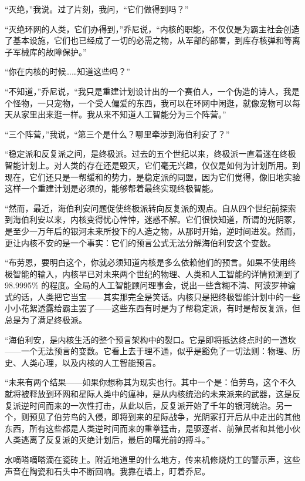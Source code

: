 \documentclass[AutoFakeBold=true]{book}
\begin{document}
``灭绝，''我说。过了片刻，我问，``它们做得到吗？''

``灭绝环网的人类，它们办得到，''乔尼说，``内核的职能，不仅仅是为霸主社会创造了基本设施，它们也已经成了一切的必需之物，从军部的部署，到库存核弹和等离子军械库的故障保护。''

``你在内核的时候……知道这些吗？''

``不知道，''乔尼说，``我只是重建计划设计出的一个赛伯人，一个伪造的诗人，我是个怪物，一只宠物，一个受人偏爱的东西，我可以在环网中闲逛，就像宠物可以每天从家里出来逛一样。我从来不知道人工智能分为三个阵营。''

``三个阵营，''我说，``第三个是什么？哪里牵涉到海伯利安了？''

``稳定派和反复派之间，是终极派。过去的五个世纪以来，终极派一直着迷在终极智能计划上。对人类的存在还是毁灭，它们毫无兴趣，仅仅是如何为计划所用。到现在，它们还只是一帮缓和的势力，是稳定派的同盟，因为它们觉得，像旧地实验这样一个重建计划是必须的，能够帮着最终实现终极智能。

``然而，最近，海伯利安问题促使终极派转向反复派的观点。自从四个世纪前探索到海伯利安以来，内核变得忧心忡忡，迷惑不解。它们很快知道，所谓的光阴冢，是至少一万年后的银河未来所投下的人造之物，从那时开始，逆时间进发。然而，更让内核不安的是一个事实：它们的预言公式无法分解海伯利安这个变数。

``布劳恩，要明白这个，你就必须知道内核是多么依赖他们的预言。如果不使用终极智能的输入，内核早已对未来两个世纪的物理、人类和人工智能的详情预测到了 98.9995\% 的程度。全局的人工智能顾问理事会，说出一些含糊不清、阿波罗神谕式的话，人类把它当宝——其实那完全是笑话。内核只是把终极智能计划中的一些小小花絮透露给霸主罢了——这些东西有时是为了帮稳定派，有时是帮反复派，但总是为了满足终极派。

``海伯利安，是内核生活的整个预言架构中的裂口。它是即将抵达终点时的一道坎——一个无法预言的变数。它看上去于理不通，似乎是豁免了一切法则：物理、历史、人类心理，以及内核的人工智能预言。

``未来有两个结果——如果你想称其为现实也行。其中一个是：伯劳鸟，这个不久就将被释放到环网和星际人类中的瘟神，是从内核统治的未来派来的武器，这是反复派逆时间而来的一次性打击，从此以后，反复派开始了千年的银河统治。另一个，则预见了伯劳鸟的入侵，即将到来的星际战争，光阴冢打开后从中走出的其他东西，所有这些都是人类逆时间而来的重拳猛击，是驱逐者、前殖民者和其他小伙人类逃离了反复派的灭绝计划后，最后的曙光前的搏斗。''

\vspace*{1em}

水嘀嗒嘀嗒滴在瓷砖上。附近地道里的什么地方，传来机修烧灼工的警示声，这些声音在陶瓷和石头中不断回响。我靠在墙上，盯着乔尼。
\end{document}

